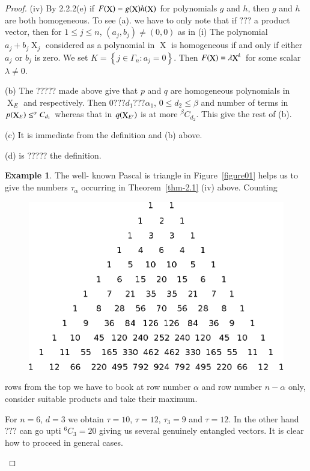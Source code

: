 \documentclass[a4paper,12pt]{article}
\DeclareMathOperator{\x}{\mathrm{X}}
\theoremstyle{definition}
\theoremstyle{underlinethm}
\newtheorem{example}{Example}[section]
\theoremstyle{definition}
\begin{document}
\begin{proof}
  (iv) By 2.2.2(e) if $F(\bold{\x})= g(\bold{\x}) h(\bold{\x})$ for polynomials $g$ and $h$, then $g$ and $h$ are both homogeneous. To see (a). we have to only note that if $???$ a product vector, then for $1 \leq j \leq n$, $(a_{j}, b_{j}) \neq (0,0)$ as in (i) The polynomial $a_{j} + b_{j} \x_{j}$ considered as a polynomial in $\x$ is homogeneous if and only if either $a_{j}$ or $b_{j}$ is zero. We set $K = \left\{ j \in \Gamma_{n} : a_{j} = 0\right\}$. Then $F(\bold{\x}) = \lambda\bold{\x}^{k}$ for some scalar $\lambda \neq 0$.
  
  (b) The ????? made above give that $p$ and $q$ are homogeneous polynomials in $\x_{E}$ and respectively. Then  $0 ??? d_{1} ??? \alpha_{1}$, $0 \leq d_{2} \leq \beta $ and number of terms in $p(\bold{\x}_{E}) \leq ^{\alpha}C_{d_{1}}$  whereas that in $q(\bold{\x}_{E'})$ is at more $^{\beta}C_{d_{2}}$. This give the rest of (b).
  
  (c) It is immediate from the definition and (b) above.
  
  (d) is ????? the definition.
 
 \begin{example}\label{example-2.1}
The well- known Pascal is triangle in Figure~\eqref{figure01} helps us to give the numbers $\tau_{\alpha}$ occurring in Theorem~\eqref{thm-2.1} (iv) above. Counting 

\begin{figure}[h]
\centering
\includegraphics[scale=.8]{figure/fig1.eps}
\caption{}\label{fig01}
\end{figure}

rows from the top we have to book at row number $\alpha$ and row number $n-\alpha$ only, consider suitable products and take their maximum.

For $n=6$, $d=3$ we obtain $\tau = 10$, $\tau = 12$, $\tau_{3} = 9$ and $\tau = 12$. In the other hand $???$ can go upti $^6C_{3} = 20$ giving us several genuinely entangled vectors. It is clear how to proceed in general cases.
\end{example}
\end{proof}
\end{document}
